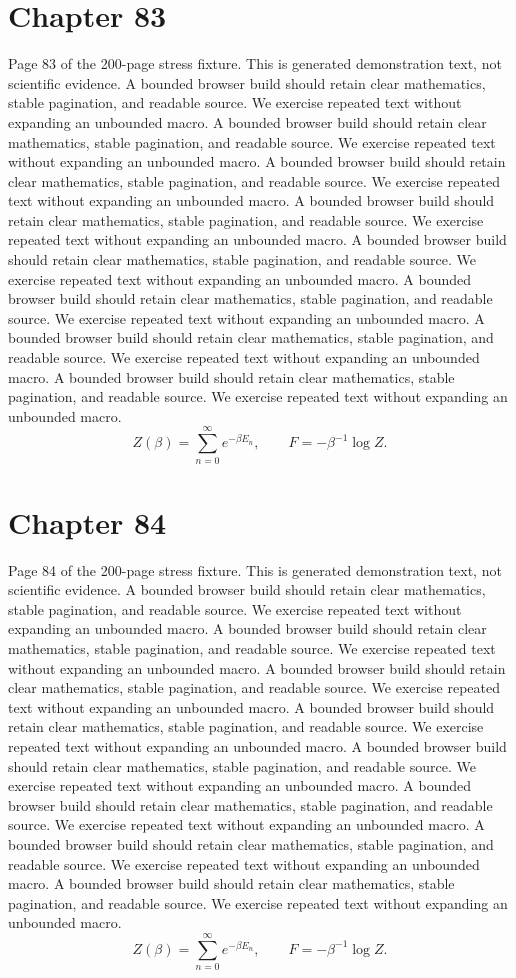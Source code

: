 \documentclass[11pt]{article}
\begin{document}
\section*{Chapter 83}
Page 83 of the 200-page stress fixture. This is generated demonstration text, not scientific evidence.
A bounded browser build should retain clear mathematics, stable pagination, and readable source. We exercise repeated text without expanding an unbounded macro.
A bounded browser build should retain clear mathematics, stable pagination, and readable source. We exercise repeated text without expanding an unbounded macro.
A bounded browser build should retain clear mathematics, stable pagination, and readable source. We exercise repeated text without expanding an unbounded macro.
A bounded browser build should retain clear mathematics, stable pagination, and readable source. We exercise repeated text without expanding an unbounded macro.
A bounded browser build should retain clear mathematics, stable pagination, and readable source. We exercise repeated text without expanding an unbounded macro.
A bounded browser build should retain clear mathematics, stable pagination, and readable source. We exercise repeated text without expanding an unbounded macro.
A bounded browser build should retain clear mathematics, stable pagination, and readable source. We exercise repeated text without expanding an unbounded macro.
A bounded browser build should retain clear mathematics, stable pagination, and readable source. We exercise repeated text without expanding an unbounded macro.
\[Z(\beta)=\sum_{n=0}^{\infty}e^{-\beta E_n},\qquad F=-\beta^{-1}\log Z.\]
\newpage
\section*{Chapter 84}
Page 84 of the 200-page stress fixture. This is generated demonstration text, not scientific evidence.
A bounded browser build should retain clear mathematics, stable pagination, and readable source. We exercise repeated text without expanding an unbounded macro.
A bounded browser build should retain clear mathematics, stable pagination, and readable source. We exercise repeated text without expanding an unbounded macro.
A bounded browser build should retain clear mathematics, stable pagination, and readable source. We exercise repeated text without expanding an unbounded macro.
A bounded browser build should retain clear mathematics, stable pagination, and readable source. We exercise repeated text without expanding an unbounded macro.
A bounded browser build should retain clear mathematics, stable pagination, and readable source. We exercise repeated text without expanding an unbounded macro.
A bounded browser build should retain clear mathematics, stable pagination, and readable source. We exercise repeated text without expanding an unbounded macro.
A bounded browser build should retain clear mathematics, stable pagination, and readable source. We exercise repeated text without expanding an unbounded macro.
A bounded browser build should retain clear mathematics, stable pagination, and readable source. We exercise repeated text without expanding an unbounded macro.
\[Z(\beta)=\sum_{n=0}^{\infty}e^{-\beta E_n},\qquad F=-\beta^{-1}\log Z.\]
\newpage
\end{document}
